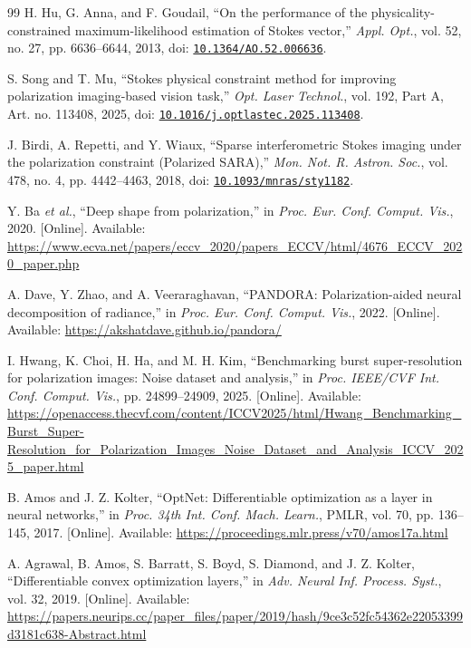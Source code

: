 \documentclass[10pt,a4paper]{article}
\begin{document}
\FloatBarrier
\setlength{\bibsep}{0.5em}
\begin{thebibliography}{99}
 H. Hu, G. Anna, and F. Goudail, ``On the performance of the physicality-constrained maximum-likelihood estimation of Stokes vector,'' \emph{Appl. Opt.}, vol. 52, no. 27, pp. 6636--6644, 2013, doi: \href{https://doi.org/10.1364/AO.52.006636}{\nolinkurl{10.1364/AO.52.006636}}.

 S. Song and T. Mu, ``Stokes physical constraint method for improving polarization imaging-based vision task,'' \emph{Opt. Laser Technol.}, vol. 192, Part A, Art. no. 113408, 2025, doi: \href{https://doi.org/10.1016/j.optlastec.2025.113408}{\nolinkurl{10.1016/j.optlastec.2025.113408}}.

 J. Birdi, A. Repetti, and Y. Wiaux, ``Sparse interferometric Stokes imaging under the polarization constraint (Polarized SARA),'' \emph{Mon. Not. R. Astron. Soc.}, vol. 478, no. 4, pp. 4442--4463, 2018, doi: \href{https://doi.org/10.1093/mnras/sty1182}{\nolinkurl{10.1093/mnras/sty1182}}.

 Y. Ba \emph{et al.}, ``Deep shape from polarization,'' in \emph{Proc. Eur. Conf. Comput. Vis.}, 2020. [Online]. Available: \url{https://www.ecva.net/papers/eccv_2020/papers_ECCV/html/4676_ECCV_2020_paper.php}

 A. Dave, Y. Zhao, and A. Veeraraghavan, ``PANDORA: Polarization-aided neural decomposition of radiance,'' in \emph{Proc. Eur. Conf. Comput. Vis.}, 2022. [Online]. Available: \url{https://akshatdave.github.io/pandora/}

 I. Hwang, K. Choi, H. Ha, and M. H. Kim, ``Benchmarking burst super-resolution for polarization images: Noise dataset and analysis,'' in \emph{Proc. IEEE/CVF Int. Conf. Comput. Vis.}, pp. 24899--24909, 2025. [Online]. Available: \url{https://openaccess.thecvf.com/content/ICCV2025/html/Hwang_Benchmarking_Burst_Super-Resolution_for_Polarization_Images_Noise_Dataset_and_Analysis_ICCV_2025_paper.html}

 B. Amos and J. Z. Kolter, ``OptNet: Differentiable optimization as a layer in neural networks,'' in \emph{Proc. 34th Int. Conf. Mach. Learn.}, PMLR, vol. 70, pp. 136--145, 2017. [Online]. Available: \url{https://proceedings.mlr.press/v70/amos17a.html}

 A. Agrawal, B. Amos, S. Barratt, S. Boyd, S. Diamond, and J. Z. Kolter, ``Differentiable convex optimization layers,'' in \emph{Adv. Neural Inf. Process. Syst.}, vol. 32, 2019. [Online]. Available: \url{https://papers.neurips.cc/paper_files/paper/2019/hash/9ce3c52fc54362e22053399d3181c638-Abstract.html}


\end{thebibliography}
\end{document}
